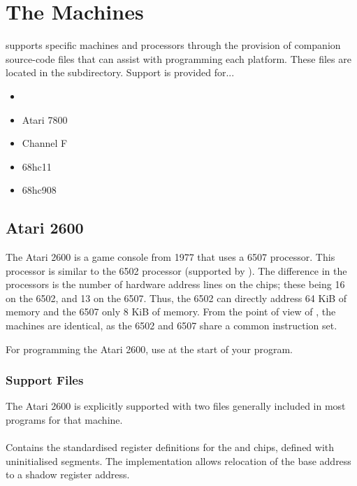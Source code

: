 

\chapter{The Machines}

\dasm supports specific machines and processors through the provision of companion source-code files that can assist with programming each platform. These files are located in the  subdirectory. Support is provided for...

\begin{itemize}
\item {}
\item Atari 7800
\item Channel F
\item 68hc11
\item 68hc908
\end{itemize}


\section{Atari 2600}
\label{machine:atari2600}
\label{changelog:20200908atari}

The Atari 2600 is a game console from 1977 that uses a 6507 processor. This processor is similar to the 6502 processor (supported by \dasm). The difference in the processors is the number of hardware address lines on the chips; these being 16 on the 6502, and 13 on the 6507. Thus, the 6502 can directly address 64 KiB of memory and the 6507 only 8 KiB of memory.  From the point of view of \dasm, the machines are identical, as the 6502 and 6507 share a common instruction set.

For programming the Atari 2600, use  at the start of your program.

\subsection{Support Files}

The Atari 2600 is explicitly supported with two files generally included in most programs for that machine.

\subsubsection{}

Contains the standardised register definitions for the  and  chips, defined with uninitialised segments. The implementation allows relocation of the  base address to a shadow register address.

